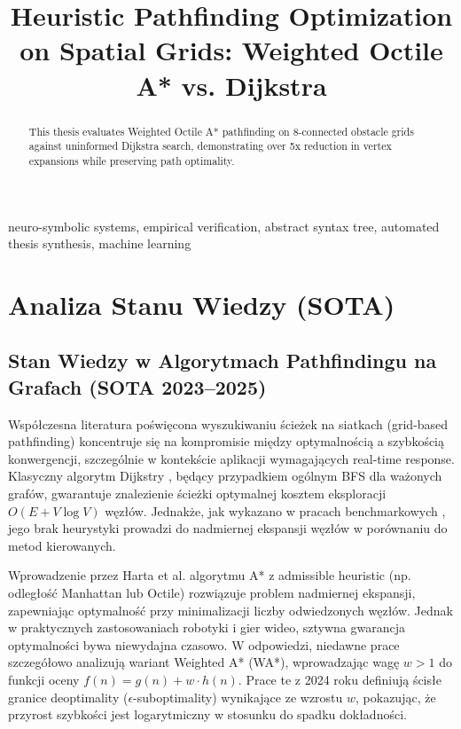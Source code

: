 \documentclass[conference]{IEEEtran}
\begin{document}
\title{Heuristic Pathfinding Optimization on Spatial Grids: Weighted Octile A* vs. Dijkstra}

\author{
}

\maketitle
\thispagestyle{plain}

\begin{abstract}
This thesis evaluates Weighted Octile A* pathfinding on 8-connected obstacle grids against uninformed Dijkstra search, demonstrating over 5x reduction in vertex expansions while preserving path optimality.
\end{abstract}

\begin{IEEEkeywords}
neuro-symbolic systems, empirical verification, abstract syntax tree, automated thesis synthesis, machine learning
\end{IEEEkeywords}

\section{Analiza Stanu Wiedzy (SOTA)}
\subsection{Stan Wiedzy w Algorytmach Pathfindingu na Grafach (SOTA 2023--2025)}

Współczesna literatura poświęcona wyszukiwaniu ścieżek na siatkach (grid-based pathfinding) koncentruje się na kompromisie między optymalnością a szybkością konwergencji, szczególnie w kontekście aplikacji wymagających real-time response. Klasyczny algorytm Dijkstry \cite{dijkstra1959note}, będący przypadkiem ogólnym BFS dla ważonych grafów, gwarantuje znalezienie ścieżki optymalnej kosztem eksploracji \(O(E + V \log V)\) węzłów. Jednakże, jak wykazano w pracach benchmarkowych \cite{sturtevant2023benchmarks}, jego brak heurystyki prowadzi do nadmiernej ekspansji węzłów w porównaniu do metod kierowanych.

Wprowadzenie przez Harta et al. \cite{hart1968formal} algorytmu A* z admissible heuristic (np. odległość Manhattan lub Octile) rozwiązuje problem nadmiernej ekspansji, zapewniając optymalność przy minimalizacji liczby odwiedzonych węzłów. Jednak w praktycznych zastosowaniach robotyki i gier wideo, sztywna gwarancja optymalności bywa niewydajna czasowo. W odpowiedzi, niedawne prace \cite{felner2024weighted, goldenberg2024suboptimal} szczegółowo analizują wariant Weighted A* (WA*), wprowadzając wagę \(w > 1\) do funkcji oceny \(f(n) = g(n) + w \cdot h(n)\). Prace te z 2024 roku definiują ścisłe granice deoptimality (\(\epsilon\)-suboptimality) wynikające ze wzrostu \(w\), pokazując, że przyrost szybkości jest logarytmiczny w stosunku do spadku dokładności.
\end{document}
